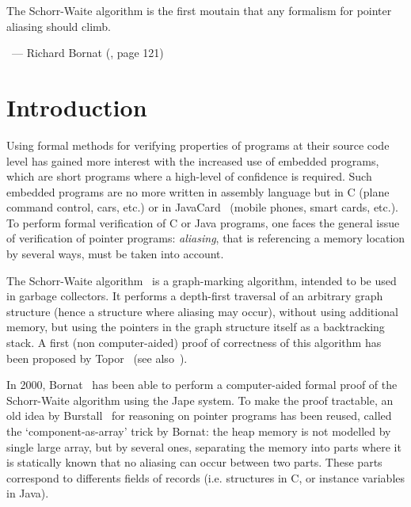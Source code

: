 


\hfill\begin{minipage}{0.6\textwidth}
\begin{slshape}
The Schorr-Waite algorithm is the first moutain that any formalism for
pointer aliasing should climb.
\end{slshape}

~\hfill --- Richard Bornat (\cite{bornat00mpc}, page 121)
\end{minipage}

\section{Introduction}

Using formal methods for verifying properties of programs at their
source code level has gained more interest with the increased use of
embedded programs, which are short programs where a high-level of
confidence is required. Such embedded programs are no more written in
assembly language but in C (plane command control, cars, etc.) or in
JavaCard~\cite{JavaCard} (mobile phones, smart cards, etc.).  To
perform formal verification of C or Java programs, one faces the
general issue of verification of pointer programs: \emph{aliasing},
that is referencing a memory location by several ways, must be taken
into account. 

The Schorr-Waite algorithm~\cite{schorr67cacm} is a graph-marking
algorithm, intended to be used in garbage collectors. It performs a
depth-first traversal of an arbitrary graph structure (hence a
structure where aliasing may occur), without using additional memory,
but using the pointers in the graph structure itself as a backtracking
stack. A first (non computer-aided) proof of correctness of this
algorithm has been proposed by Topor~\cite{topor79acta} (see
also~\cite{morris82}). %


In 2000, Bornat~\cite{bornat00mpc} has been able to perform a
computer-aided formal proof of the Schorr-Waite algorithm using the
Jape system. To make the proof tractable, an old idea by
Burstall~\cite{burstall72} for reasoning on pointer programs has been
reused, called the `component-as-array' trick by Bornat: the heap
memory is not modelled by single large array, but by several ones,
separating the memory into parts where it is statically known that no
aliasing can occur between two parts. These parts correspond to
differents fields of records (i.e. structures in C, or instance
variables in Java).

